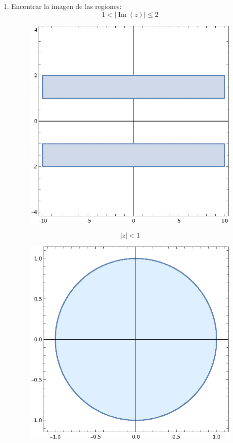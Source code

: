 \documentclass[11pt]{article}
\begin{document}
\begin{enumerate}
    \item Encontrar la imagen de las regiones:
    \[1 < | \operatorname{Im}(z) | \leq 2\]

    \begin{figure}[H]
    \centering
    \includegraphics[scale=0.8]{P3-1.eps}
    \end{figure}

    \[|z| < 1\]

    \begin{figure}[H]
    \centering
    \includegraphics[scale=0.8]{P3-2.eps}
    \end{figure}


\end{enumerate}
\end{document}
